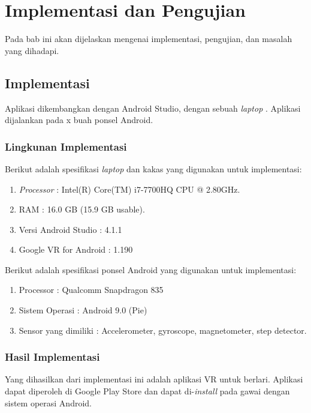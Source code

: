 \chapter{Implementasi dan Pengujian}

Pada bab ini akan dijelaskan mengenai implementasi, pengujian, dan masalah yang dihadapi. 

\section{Implementasi}
Aplikasi dikembangkan dengan Android Studio, dengan sebuah \textit{laptop} . Aplikasi dijalankan pada x buah ponsel Android.

\subsection{Lingkunan Implementasi}
Berikut adalah spesifikasi \textit{laptop} dan kakas yang digunakan untuk implementasi:

\begin{enumerate}
	\item \textit{Processor} : Intel(R) Core(TM) i7-7700HQ CPU @ 2.80GHz.
	
	\item RAM : 16.0 GB (15.9 GB usable).
	
	\item Versi Android Studio : 4.1.1
	
	\item Google VR for Android : 1.190
\end{enumerate}

Berikut adalah spesifikasi ponsel Android yang digunakan untuk implementasi:

\begin{enumerate}
	\item Processor : Qualcomm Snapdragon 835
	
	\item Sistem Operasi : Android 9.0 (Pie)
	
	\item Sensor yang dimiliki : Accelerometer, gyroscope, magnetometer, step detector.  
\end{enumerate}

\subsection{Hasil Implementasi}
Yang dihasilkan dari implementasi ini adalah aplikasi VR untuk berlari. Aplikasi dapat diperoleh di Google Play Store dan dapat di-\textit{install} pada gawai dengan sistem operasi Android. 

